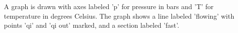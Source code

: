 A graph is drawn with axes labeled 'p' for pressure in bars and 'T' for temperature in degrees Celsius. The graph shows a line labeled 'flowing' with points 'qi' and 'qi out' marked, and a section labeled 'fast'.
